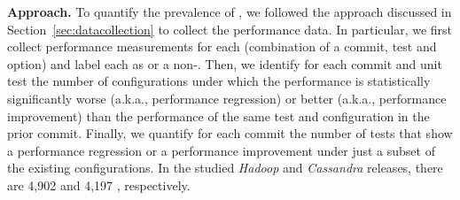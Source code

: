 \noindent \textbf{Approach.}
To quantify the prevalence of \inconsistent, we followed the approach discussed in Section~\ref{sec:datacollection} to collect the performance data. In particular, we first collect performance measurements for each \textbf{\instance} (combination of a  commit, test and option) and label each \instance as \inconsistent or a non-\inconsistent. %
Then, we identify for each commit and unit test the number of configurations under which the performance is statistically significantly worse (a.k.a., performance regression) or better (a.k.a., performance improvement) than the performance of the same test and configuration in the prior commit. Finally, we quantify for each commit the number of tests that show a performance regression or a performance improvement under just a subset of the existing configurations. %
In the studied \emph{Hadoop} and \emph{Cassandra} releases, there are 4,902 and 4,197 \instance, respectively. 




